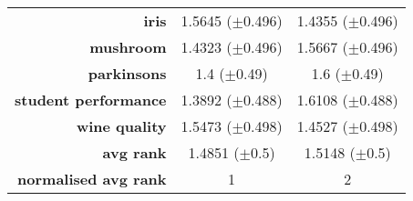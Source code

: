 \begin{table}[htbp]
{\begin{tabular}{rcc}
			\multicolumn{1}{r|}{\textbf{iris}}                & \cellcolor[rgb]{ .973,  .412,  .42}1.5645 ($\pm$0.496)    & \cellcolor[rgb]{ .388,  .745,  .482}1.4355 ($\pm$0.496) \\
			\multicolumn{1}{r|}{\textbf{mushroom}}            & \cellcolor[rgb]{ .388,  .745,  .482}1.4323 ($\pm$0.496)   & \cellcolor[rgb]{ .973,  .412,  .42}1.5667 ($\pm$0.496)  \\
			\multicolumn{1}{r|}{\textbf{parkinsons}}          & \cellcolor[rgb]{ .388,  .745,  .482}1.4 ($\pm$0.49)       & \cellcolor[rgb]{ .973,  .412,  .42}1.6 ($\pm$0.49)      \\
			\multicolumn{1}{r|}{\textbf{student performance}} & \cellcolor[rgb]{ .388,  .745,  .482}1.3892 ($\pm$0.488)   & \cellcolor[rgb]{ .973,  .412,  .42}1.6108 ($\pm$0.488)  \\
			\multicolumn{1}{r|}{\textbf{wine quality}}        & \cellcolor[rgb]{ .973,  .412,  .42}1.5473 ($\pm$0.498)    & \cellcolor[rgb]{ .388,  .745,  .482}1.4527 ($\pm$0.498) \\
			\midrule
			\multicolumn{1}{r|}{\textbf{avg rank}}            & \cellcolor[rgb]{ .388,  .745,  .482}1.4851 ($\pm$0.5)     & \cellcolor[rgb]{ .973,  .412,  .42}1.5148 ($\pm$0.5)    \\
			\midrule
			\textbf{normalised avg rank}                      & \cellcolor[rgb]{ .388,  .745,  .482}1                     & \cellcolor[rgb]{ .973,  .412,  .42}2                    \\
		\end{tabular}%

	}
\end{table}%


